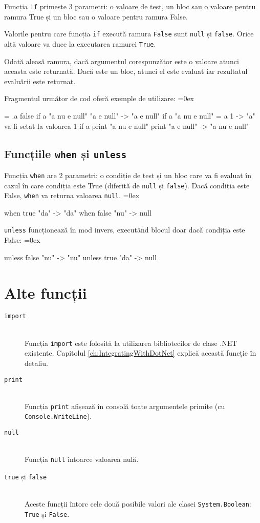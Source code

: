 \documentclass[12pt,a4paper]{memoir}
\renewcommand{\c}{\texttt}
\newenvironment{code}
{
\definecolor{shadecolor}{gray}{0.91}
\topsep=0ex
\relax
\shaded
\verbatim
}
{
\endverbatim
\endshaded
}
\begin{document}
Funcția \c{if} primește 3 parametri: o valoare de test, un bloc sau o valoare pentru ramura True și un bloc sau o valoare pentru ramura False. 

Valorile pentru care funcția \c{if} execută ramura \c{False} sunt \c{null} și \c{false}. Orice altă valoare va duce la executarea ramurei \c{True}.

Odată aleasă ramura, dacă argumentul corespunzător este o valoare atunci aceasta este returnată. Dacă este un bloc, atunci el este evaluat iar rezultatul evaluării este returnat.

Fragmentul următor de cod oferă exemple de utilizare:
\begin{code}
= .a false
if a "a nu e null" "a e null"
  -> "a e null"
if a "a nu e null" { = a 1 }
  -> "a" va fi setat la valoarea 1
if a { print "a nu e null" } { print "a e null" }
  -> "a nu e null"
\end{code}

\subsection{Funcțiile \c{when} și \c{unless}}

Funcția \c{when} are 2 parametri: o condiție de test și un bloc care va fi evaluat în cazul în care condiția este True (diferită de \c{null} și \c{false}). Dacă condiția este False, \c{when} va returna valoarea \c{null}.
\begin{code}
when true { "da" }
  -> "da"
when false { "nu" }
  -> null
\end{code}

\c{unless} funcționează în mod invers, executând blocul doar dacă condiția este False:
\begin{code}
unless false { "nu" }
  -> "nu"
unless true { "da" }
  -> null
\end{code}

\section{Alte funcții}

\begin{description}
\item[\c{import}]\hfill\\ Funcția \c{import} este folosită la utilizarea bibliotecilor de clase .NET existente. Capitolul \ref{ch:IntegratingWithDotNet} explică această funcție în detaliu.
\item[\c{print}]\hfill\\ Funcția \c{print} afișează în consolă toate argumentele primite (cu\\ \c{Console.WriteLine}).
\item[\c{null}]\hfill\\ Funcția \c{null} întoarce valoarea nulă.
\item[\c{true} și \c{false}]\hfill\\ Aceste funcții întorc cele două posibile valori ale clasei \c{System.Boolean}: \c{True} și \c{False}.
\end{description}
\end{document}
